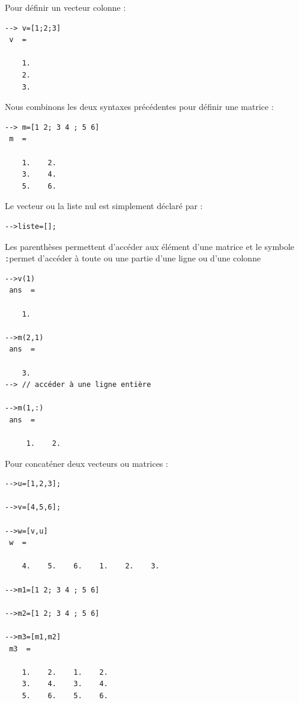Pour définir un vecteur colonne :
\begin{code}
\begin{verbatim}
--> v=[1;2;3]
 v  =
 
    1.    
    2.
    3. 
\end{verbatim}
\end{code}

Nous combinons les deux syntaxes précédentes pour définir une matrice : 
\begin{code}
\begin{verbatim}
--> m=[1 2; 3 4 ; 5 6]
 m  =
 
    1.    2.  
    3.    4.  
    5.    6.  
\end{verbatim}
\end{code}

Le vecteur ou la liste nul est simplement déclaré par :
\begin{code}
\begin{verbatim}
-->liste=[];
\end{verbatim}
\end{code}


Les parenthèses permettent d'accéder aux élément d'une matrice et le 
symbole \og\verb?:?\fg permet d'accéder à toute ou une partie d'une 
ligne ou d'une colonne
\begin{code}
\begin{verbatim}
-->v(1)
 ans  =
 
    1.  

-->m(2,1)
 ans  =
 
    3.  
--> // accéder à une ligne entière
 
-->m(1,:)
 ans  =
   
     1.    2. 
\end{verbatim}
\end{code}

\newpage
Pour concaténer deux vecteurs ou matrices :
\begin{code}
\begin{verbatim}
-->u=[1,2,3];
 
-->v=[4,5,6];
 
-->w=[v,u]
 w  =
 
    4.    5.    6.    1.    2.    3.

-->m1=[1 2; 3 4 ; 5 6]
 
-->m2=[1 2; 3 4 ; 5 6]
 
-->m3=[m1,m2]
 m3  =
 
    1.    2.    1.    2.  
    3.    4.    3.    4.  
    5.    6.    5.    6. 
\end{verbatim}
\end{code}

